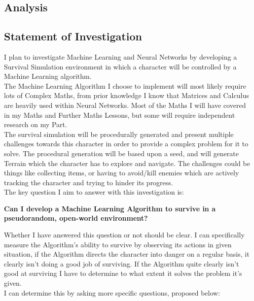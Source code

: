 \begin{flushleft}
    \section{Analysis}
        \subsection{Statement of Investigation}
            \large
            \vspace{0.2cm}
            I plan to investigate Machine Learning and Neural Networks by developing a Survival Simulation environment 
            in which a character will be controlled by a Machine Learning algorithm. \\
            \vspace{0.2cm}
            The Machine Learning Algorithm I choose to implement will most likely require lots of Complex Maths, from prior knowledge
            I know that Matrices and Calculus are heavily used within Neural Networks. Most of the Maths I will have 
            covered in my Maths and Further Maths Lessons, but some will require independent research on my Part. \\
            \vspace{0.2cm}
            The survival simulation will be procedurally generated and present multiple challenges 
            towards this character in order to provide a complex problem for it to solve. The procedural generation will
            be based upon a seed, and will generate Terrain which the character has to explore and navigate. The challenges 
            could be things like collecting items, or having to avoid/kill enemies which are actively tracking the character 
            and trying to hinder its progress. \\
            \vspace{0.2cm}
            The key question I aim to answer with this investigation is:

            \begin{center}
                \vspace{0.3cm}
                \textbf{Can I develop a Machine Learning Algorithm to survive in a pseudorandom, open-world environment?}
                \vspace{0.3cm}
            \end{center}

            Whether I have answered this question or not should be clear. I can specifically measure the Algorithm's ability 
            to survive by observing its actions in given situation, if the Algorithm directs the character into danger
            on a regular basis, it clearly isn't doing a good job of surviving. If the Algorithm quite clearly isn't good
            at surviving I have to determine to what extent it solves the problem it's given. \\
            \vspace{0.2cm}
            I can determine this by asking more specific questions, proposed below: \\


\end{flushleft}
